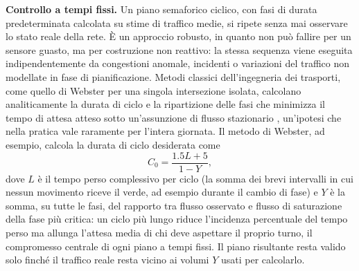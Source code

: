 \textbf{Controllo a tempi fissi.} Un piano semaforico ciclico, con fasi di
durata predeterminata calcolata su stime di traffico medie, si ripete
senza mai osservare lo stato reale della rete. È un approccio robusto, in
quanto non può fallire per un sensore guasto, ma per costruzione non
reattivo: la stessa sequenza viene eseguita indipendentemente da
congestioni anomale, incidenti o variazioni del traffico non modellate in
fase di pianificazione. Metodi classici dell'ingegneria dei trasporti,
come quello di Webster per una singola intersezione isolata, calcolano
analiticamente la durata di ciclo e la ripartizione delle fasi che
minimizza il tempo di attesa atteso sotto un'assunzione di flusso
stazionario \citep{wei2020tscsurvey}, un'ipotesi che nella pratica vale
raramente per l'intera giornata. Il metodo di Webster, ad esempio, calcola
la durata di ciclo desiderata come
\[C_0 = \frac{1.5L + 5}{1 - Y},\]
dove $L$ è il tempo perso complessivo per ciclo (la somma dei brevi
intervalli in cui nessun movimento riceve il verde, ad esempio durante il
cambio di fase) e $Y$ è la somma, su tutte le fasi, del rapporto tra flusso
osservato e flusso di saturazione della fase più critica: un ciclo più
lungo riduce l'incidenza percentuale del tempo perso ma allunga l'attesa
media di chi deve aspettare il proprio turno, il compromesso centrale di
ogni piano a tempi fissi. Il piano risultante resta valido solo finché il
traffico reale resta vicino ai volumi $Y$ usati per calcolarlo.

